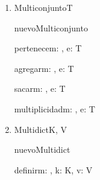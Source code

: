 \begin{enumerate}[label=\alph*)]
	\item \begin{tad}{Multiconjunto}{T}

		      \begin{proc}{nuevoMulticonjunto}{}{\tadtype}
		      \end{proc}

		      \begin{proc}{pertenece}{\In m: \tadtype, \In e: T}{\bool}
		      \end{proc}

		      \begin{proc}{agregar}{\Inout m: \tadtype, \In e: T}{}
		      \end{proc}

		      \begin{proc}{sacar}{\Inout m: \tadtype, \In e: T}{}
		      \end{proc}

		      \begin{proc}{multiplicidad}{\In m: \tadtype, \In e: T}{\ent}
		      \end{proc}
	      \end{tad}

	      \pagebreak

	\item \begin{tad}{Multidict}{K, V}

		      \begin{proc}{nuevoMultidict}{}{\tadtype}
		      \end{proc}

		      \begin{proc}{definir}{\Inout m: \tadtype, \In k: K, \In v: V}{}
		      \end{proc}


\end{tad}
\end{enumerate}
